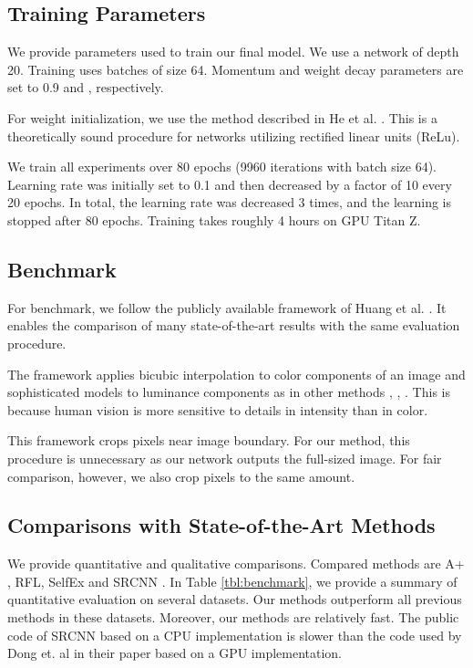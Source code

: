\documentclass[10pt,twocolumn,letterpaper]{article}
\begin{document}
\subsection{Training Parameters}
We provide parameters used to train our final model. We use a network of depth 20. Training uses batches of size 64. Momentum and weight decay parameters are set to 0.9 and , respectively. 

For weight initialization, we use the method described in He et al. \cite{he2015delving}. This is a theoretically sound procedure for networks utilizing rectified linear units (ReLu).

We train all experiments over 80 epochs (9960 iterations with batch size 64). Learning rate was initially set to 0.1 and then decreased by a factor of 10 every 20 epochs. In total, the learning rate was decreased 3 times, and the learning
is stopped after 80 epochs. Training takes roughly 4 hours on GPU Titan Z. 



\subsection{Benchmark}
For benchmark, we follow the publicly available framework of Huang et al. \cite{Timofte2013}. It enables the comparison of many state-of-the-art results with the same evaluation procedure.

The framework applies bicubic interpolation to color components of an image and sophisticated models to luminance components as in  other methods \cite{chang2004super}, \cite{glasner2009super}, \cite{zeyde2012single}. This is because human vision is more sensitive to details in intensity than in color.

This framework crops pixels near image boundary. For our method, this procedure is unnecessary as our network outputs the full-sized image. For fair comparison, however, we also crop pixels to the same amount.



\subsection{Comparisons with State-of-the-Art Methods}
We provide quantitative and qualitative comparisons. Compared methods are A+ \cite{Timofte}, RFL\cite{schulter2015fast}, SelfEx \cite{Huang-CVPR-2015} and SRCNN \cite{Dong2014}. In Table \ref{tbl:benchmark}, we provide a summary of quantitative evaluation on several datasets. Our methods outperform all previous methods in these datasets. Moreover, our methods are relatively fast. The public code of SRCNN based on a CPU implementation is slower than the code used by Dong et. al \cite{dong2015image} in their paper based on a GPU implementation.
\end{document}
